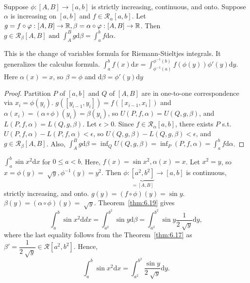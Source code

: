 \begin{thm}\label{thm:change_of_variables}\\
	Suppose $\phi:[A,B]\to [a,b]$ is strictly increasing, continuous, and onto.
	Suppose $\alpha$ is increasing on $[a,b]$ and $f \in \mathscr{R}_{\alpha}[a,b]$.
	Let $g=f \circ \varphi: [A,B]\to \mathbb{R}, \beta=\alpha \circ \varphi: [A,B]\to \mathbb{R}$.
	Then $g \in \mathscr{R}_{\beta}[A,B] \text{ and } \int_{A}^{B}{g\mathrm{d}\beta}= \int_{a}^{b}{f\mathrm{d}\alpha}$.
	\begin{note}
		This is the change of variables formula for Riemann-Stieltjes integrals.
		It generalizes the calculus formula.
		$\int_{a}^{b}{f(x)\mathrm{d}x}=\int_{{\phi ^{-1}}(a)}^{\phi^{-1}(b)}{f(\phi(y))\phi'(y)\mathrm{d}y}$. Here $\alpha(x)=x$, so $\beta=\phi$ and $\mathrm{d}\beta=\phi'(y)\mathrm{d}y$
	\end{note}

	\begin{proof}
		Partition $P$ of $[a,b]$ and $Q$ of $[A,B]$ are in one-to-one correspondence via $x_i=\phi(y_i)$.
		$g([y_{i-1},y_{i}])=f([x_{i-1},x_{i}])$ and $\alpha(x_{i})=(\alpha \circ \phi)(y_i)=\beta(y_i)$, so $U(P,f,\alpha)=U(Q,g,\beta)$, and $L(P,f,\alpha)=L(Q,g,\beta)$.
		Let $\epsilon>0$. Since $f \in \mathscr{R}_{\alpha}[a,b]$, there exists $P$ s.t. $U(P,f,\alpha)-L(P,f,\alpha)<\epsilon$, so $U(Q,g,\beta)-L(Q,g,\beta)<\epsilon$, and $g \in \mathscr{R}_{\beta}[A,B]$.
		Also, $\int_{A}^{B}{g\mathrm{d}\beta}=\inf_{Q}U(Q,g,\beta)=\inf_{P}(P,f,\alpha)=\int_{a}^{b}{f\mathrm{d}\alpha}$.
	\end{proof}
	\begin{example}
		$\int_{a}^{b}{\sin{x^2}\mathrm{d}x}$ for $0\le a<b$.
		Here, $f(x)=\sin{x^2},\alpha(x)=x$.
		Let $x^2=y$, so $x=\phi(y)=\sqrt[]{y}, \phi^{-1}(y)=y^2$.
		Then $\phi:\underbrace{[a^2,b^2]}_{=[A,B]}\to [a,b]$ is continuous, strictly increasing, and onto.
		$g(y)=(f \circ \phi)(y)=\sin{y}$.
		$\beta(y)=(\alpha \circ \phi)(y)=\sqrt[]{y}$.
		Theorem~\ref{thm:6.19} gives
		\[
			\int_{a}^{b}{\sin{x^2}\mathrm{d}dx}
			=\int_{a^2}^{b^2}{\sin{y}\mathrm{d}\beta}
			=\int_{a^2}^{b^2}{\sin{y}\dfrac{1}{2\sqrt[]{y}}\mathrm{d}y}
			,\]
		where the last equality follows from the Theorem~\ref{thm:6.17} as $\beta'=\dfrac{1}{2 \sqrt[]{y}} \in \mathscr{R}[a^2,b^2]$.
		Hence,
		\[
			\int_{a}^{b}{\sin{x^2}\mathrm{d}x}=\int_{a^2}^{b^2}{\dfrac{\sin{y}}{2\sqrt[]{y}}\mathrm{d}y}.
		\]
	\end{example}
\end{thm}

